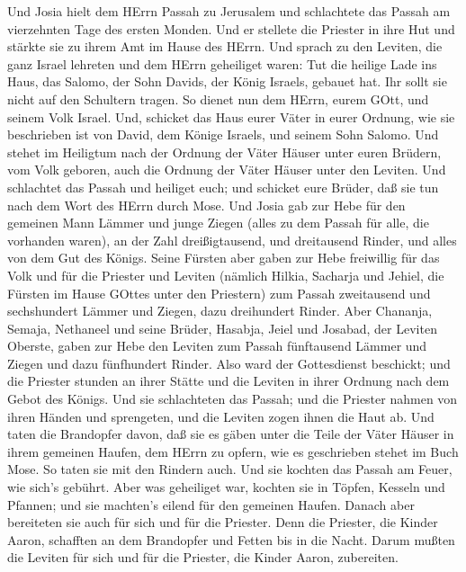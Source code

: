  Und Josia hielt dem HErrn Passah zu Jerusalem und
schlachtete das Passah am vierzehnten Tage des ersten Monden.
 Und er stellete die Priester in ihre Hut und stärkte sie zu
ihrem Amt im Hause des HErrn.  Und sprach zu den Leviten,
die ganz Israel lehreten und dem HErrn geheiliget waren: Tut die heilige
Lade ins Haus, das Salomo, der Sohn Davids, der König Israels, gebauet
hat. Ihr sollt sie nicht auf den Schultern tragen. So dienet nun dem
HErrn, eurem GOtt, und seinem Volk Israel.  Und, schicket
das Haus eurer Väter in eurer Ordnung, wie sie beschrieben ist von
David, dem Könige Israels, und seinem Sohn Salomo.  Und
stehet im Heiligtum nach der Ordnung der Väter Häuser unter euren
Brüdern, vom Volk geboren, auch die Ordnung der Väter Häuser unter den
Leviten.  Und schlachtet das Passah und heiliget euch; und
schicket eure Brüder, daß sie tun nach dem Wort des HErrn durch Mose.
 Und Josia gab zur Hebe für den gemeinen Mann Lämmer und
junge Ziegen (alles zu dem Passah für alle, die vorhanden waren), an der
Zahl dreißigtausend, und dreitausend Rinder, und alles von dem Gut des
Königs.  Seine Fürsten aber gaben zur Hebe freiwillig für
das Volk und für die Priester und Leviten (nämlich Hilkia, Sacharja und
Jehiel, die Fürsten im Hause GOttes unter den Priestern) zum Passah
zweitausend und sechshundert Lämmer und Ziegen, dazu dreihundert Rinder.
 Aber Chananja, Semaja, Nethaneel und seine Brüder, Hasabja,
Jeiel und Josabad, der Leviten Oberste, gaben zur Hebe den Leviten zum
Passah fünftausend Lämmer und Ziegen und dazu fünfhundert Rinder.
 Also ward der Gottesdienst beschickt; und die Priester
stunden an ihrer Stätte und die Leviten in ihrer Ordnung nach dem Gebot
des Königs.  Und sie schlachteten das Passah; und die
Priester nahmen von ihren Händen und sprengeten, und die Leviten zogen
ihnen die Haut ab.  Und taten die Brandopfer davon, daß sie
es gäben unter die Teile der Väter Häuser in ihrem gemeinen Haufen, dem
HErrn zu opfern, wie es geschrieben stehet im Buch Mose. So taten sie
mit den Rindern auch.  Und sie kochten das Passah am Feuer,
wie sich's gebührt. Aber was geheiliget war, kochten sie in Töpfen,
Kesseln und Pfannen; und sie machten's eilend für den gemeinen Haufen.
 Danach aber bereiteten sie auch für sich und für die
Priester. Denn die Priester, die Kinder Aaron, schafften an dem
Brandopfer und Fetten bis in die Nacht. Darum mußten die Leviten für
sich und für die Priester, die Kinder Aaron, zubereiten. 
